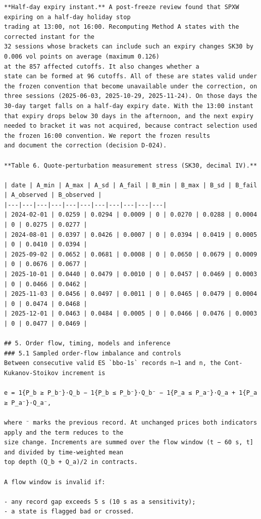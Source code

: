 \documentclass[11pt]{article}
\begin{document}
\begin{verbatim}
**Half-day expiry instant.** A post-freeze review found that SPXW expiring on a half-day holiday stop
trading at 13:00, not 16:00. Recomputing Method A states with the corrected instant for the
32 sessions whose brackets can include such an expiry changes SK30 by
0.006 vol points on average (maximum 0.126)
at the 857 affected cutoffs. It also changes whether a
state can be formed at 96 cutoffs. All of these are states valid under the frozen convention that become unavailable under the correction, on three sessions (2025-06-03, 2025-10-29, 2025-11-24). On those days the 30-day target falls on a half-day expiry date. With the 13:00 instant that expiry drops below 30 days in the afternoon, and the next expiry needed to bracket it was not acquired, because contract selection used the frozen 16:00 convention. We report the frozen results
and document the correction (decision D-024).

**Table 6. Quote-perturbation measurement stress (SK30, decimal IV).**

| date | A_min | A_max | A_sd | A_fail | B_min | B_max | B_sd | B_fail | A_observed | B_observed |
|---|---|---|---|---|---|---|---|---|---|---|
| 2024-02-01 | 0.0259 | 0.0294 | 0.0009 | 0 | 0.0270 | 0.0288 | 0.0004 | 0 | 0.0275 | 0.0277 |
| 2024-08-01 | 0.0397 | 0.0426 | 0.0007 | 0 | 0.0394 | 0.0419 | 0.0005 | 0 | 0.0410 | 0.0394 |
| 2025-09-02 | 0.0652 | 0.0681 | 0.0008 | 0 | 0.0650 | 0.0679 | 0.0009 | 0 | 0.0676 | 0.0677 |
| 2025-10-01 | 0.0440 | 0.0479 | 0.0010 | 0 | 0.0457 | 0.0469 | 0.0003 | 0 | 0.0466 | 0.0462 |
| 2025-11-03 | 0.0456 | 0.0497 | 0.0011 | 0 | 0.0465 | 0.0479 | 0.0004 | 0 | 0.0474 | 0.0468 |
| 2025-12-01 | 0.0463 | 0.0484 | 0.0005 | 0 | 0.0466 | 0.0476 | 0.0003 | 0 | 0.0477 | 0.0469 |

## 5. Order flow, timing, models and inference
### 5.1 Sampled order-flow imbalance and controls
Between consecutive valid ES `bbo-1s` records n−1 and n, the Cont-Kukanov-Stoikov increment is

e = 1{P_b ≥ P_b⁻}·Q_b − 1{P_b ≤ P_b⁻}·Q_b⁻ − 1{P_a ≤ P_a⁻}·Q_a + 1{P_a ≥ P_a⁻}·Q_a⁻,

where ⁻ marks the previous record. At unchanged prices both indicators apply and the term reduces to the
size change. Increments are summed over the flow window (t − 60 s, t] and divided by time-weighted mean
top depth (Q_b + Q_a)/2 in contracts.

A flow window is invalid if:

- any record gap exceeds 5 s (10 s as a sensitivity);
- a state is flagged bad or crossed.


\end{verbatim}
\end{document}
